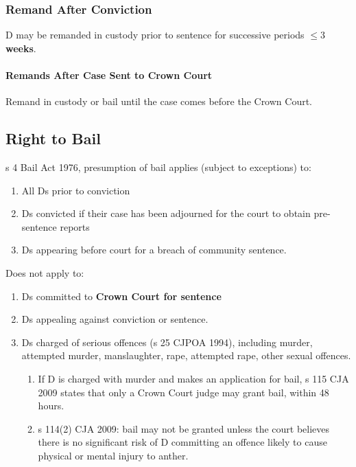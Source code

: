 \documentclass[
]{article}
\providecommand{\tightlist}{%
  \setlength{\itemsep}{0pt}\setlength{\parskip}{0pt}}
\begin{document}
\hypertarget{remand-after-conviction}{%
\subsubsection{Remand After Conviction}\label{remand-after-conviction}}

D may be remanded in custody prior to sentence for successive periods
\textbf{\(\leq 3\) weeks}.

\hypertarget{remands-after-case-sent-to-crown-court}{%
\paragraph{Remands After Case Sent to Crown
Court}\label{remands-after-case-sent-to-crown-court}}

Remand in custody or bail until the case comes before the Crown Court.

\hypertarget{right-to-bail}{%
\subsection{Right to Bail}\label{right-to-bail}}

s 4 Bail Act 1976, presumption of bail applies (subject to exceptions)
to:

\begin{enumerate}
\def\labelenumi{\arabic{enumi}.}
\tightlist
\item
  All Ds prior to conviction
\item
  Ds convicted if their case has been adjourned for the court to obtain
  pre-sentence reports
\item
  Ds appearing before court for a breach of community sentence.
\end{enumerate}

Does not apply to:

\begin{enumerate}
\def\labelenumi{\arabic{enumi}.}
\tightlist
\item
  Ds committed to \textbf{Crown Court for sentence}
\item
  Ds appealing against conviction or sentence.
\item
  Ds charged of serious offences (s 25 CJPOA 1994), including murder,
  attempted murder, manslaughter, rape, attempted rape, other sexual
  offences.

  \begin{enumerate}
  \def\labelenumii{\arabic{enumii}.}
  \tightlist
  \item
    If D is charged with murder and makes an application for bail, s 115
    CJA 2009 states that only a Crown Court judge may grant bail, within
    48 hours.
  \item
    s 114(2) CJA 2009: bail may not be granted unless the court believes
    there is no significant risk of D committing an offence likely to
    cause physical or mental injury to anther.
  \end{enumerate}
\end{enumerate}
\end{document}

